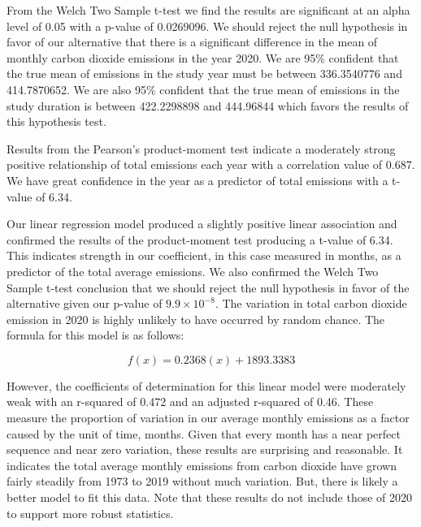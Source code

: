 \documentclass[
]{article}
\newenvironment{Shaded}{\begin{snugshade}}{\end{snugshade}}
\newcommand{\FloatTok}[1]{\textcolor[rgb]{0.00,0.00,0.81}{#1}}
\newcommand{\KeywordTok}[1]{\textcolor[rgb]{0.13,0.29,0.53}{\textbf{#1}}}
\newcommand{\NormalTok}[1]{#1}
\newcommand{\OperatorTok}[1]{\textcolor[rgb]{0.81,0.36,0.00}{\textbf{#1}}}
\newcommand{\StringTok}[1]{\textcolor[rgb]{0.31,0.60,0.02}{#1}}
\begin{document}
\begin{Shaded}
\begin{Highlighting}[]
{{{{{\NormalTok{cor.test <-}\StringTok{ }\KeywordTok{cor.test}\NormalTok{(source.totals}\OperatorTok{$}\NormalTok{Value, source.totals}\OperatorTok{$}\NormalTok{YYYYMM)}
\NormalTok{co2.lm <-}\StringTok{ }\KeywordTok{lm}\NormalTok{(source.totals}\OperatorTok{$}\NormalTok{YYYYMM }\OperatorTok{~}\StringTok{ }\NormalTok{source.totals}\OperatorTok{$}\NormalTok{avg_month)}
\NormalTok{co2.lm.res <-}\StringTok{ }\KeywordTok{summary}\NormalTok{(co2.lm)}
\NormalTok{t.test <-}\StringTok{ }\KeywordTok{t.test}\NormalTok{(source.}\FloatTok{2020.}\NormalTok{totals}\OperatorTok{$}\NormalTok{Value, source.totals}\OperatorTok{$}\NormalTok{avg_month)}
\end{Highlighting}
\end{Shaded}

From the Welch Two Sample t-test we find the results are significant at
an alpha level of 0.05 with a p-value of 0.0269096. We should reject the
null hypothesis in favor of our alternative that there is a significant
difference in the mean of monthly carbon dioxide emissions in the year
2020. We are 95\% confident that the true mean of emissions in the study
year must be between 336.3540776 and 414.7870652. We are also 95\%
confident that the true mean of emissions in the study duration is
between 422.2298898 and 444.96844 which favors the results of this
hypothesis test.

Results from the Pearson's product-moment test indicate a moderately
strong positive relationship of total emissions each year with a
correlation value of 0.687. We have great confidence in the year as a
predictor of total emissions with a t-value of 6.34.

Our linear regression model produced a slightly positive linear
association and confirmed the results of the product-moment test
producing a t-value of 6.34. This indicates strength in our coefficient,
in this case measured in months, as a predictor of the total average
emissions. We also confirmed the Welch Two Sample t-test conclusion that
we should reject the null hypothesis in favor of the alternative given
our p-value of \ensuremath{9.9\times 10^{-8}}. The variation in total
carbon dioxide emission in 2020 is highly unlikely to have occurred by
random chance. The formula for this model is as follows:

\[ f(x) = 0.2368(x) + 1893.3383\]

However, the coefficients of determination for this linear model were
moderately weak with an r-squared of 0.472 and an adjusted r-squared of
0.46. These measure the proportion of variation in our average monthly
emissions as a factor caused by the unit of time, months. Given that
every month has a near perfect sequence and near zero variation, these
results are surprising and reasonable. It indicates the total average
monthly emissions from carbon dioxide have grown fairly steadily from
1973 to 2019 without much variation. But, there is likely a better model
to fit this data. Note that these results do not include those of 2020
to support more robust statistics.
\end{document}
